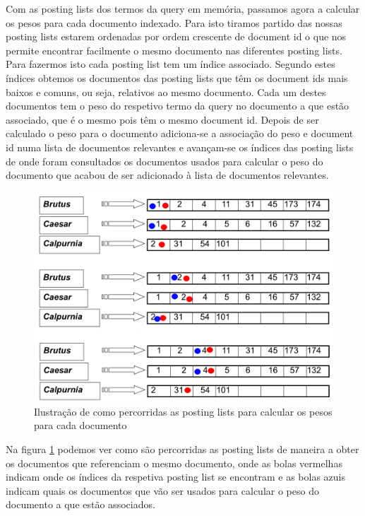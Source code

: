 \documentclass[12pt]{article}
\begin{document}
Com as posting lists dos termos da query em memória, passamos agora a
calcular os pesos para cada documento indexado.
Para isto tiramos partido das nossas posting lists estarem ordenadas
por ordem crescente de document id o que nos permite encontrar
facilmente o mesmo documento nas diferentes posting lists.
Para fazermos isto cada posting list tem um índice associado. Segundo
estes índices obtemos os documentos das posting lists que têm os
document ids mais baixos e comuns, ou seja, relativos ao mesmo
documento.
Cada um destes documentos tem o peso do respetivo termo da query no
documento a que estão associado, que é o mesmo pois têm o mesmo
document id.
Depois de ser calculado o peso para o documento adiciona-se a
associação do peso e document id numa lista de documentos relevantes
e avançam-se os índices das posting lists de onde foram consultados
os documentos usados para calcular o peso do documento que acabou de
ser adicionado à lista de documentos relevantes.

\begin{figure}[H]
  \center
   \includegraphics[width=\linewidth]{merge_algorithm.png}
  \caption{Ilustração de como percorridas as posting lists para calcular os pesos para cada documento}
  \label{fig:merge_algorithm}
\end{figure}

Na figura \ref{fig:merge_algorithm} podemos ver como são percorridas
as posting lists de maneira a obter os documentos que referenciam o
mesmo documento, onde as bolas vermelhas indicam onde os índices da
respetiva posting list se encontram e as bolas azuis indicam quais os
documentos que vão ser usados para calcular o peso do documento a
que estão associados.
\end{document}
